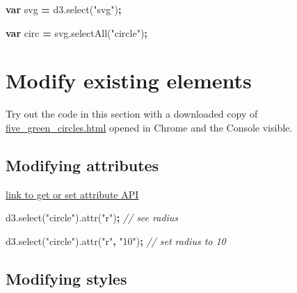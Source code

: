\documentclass[openany]{book}
\newenvironment{Shaded}{\begin{snugshade}}{\end{snugshade}}
\newcommand{\AttributeTok}[1]{\textcolor[rgb]{0.77,0.63,0.00}{#1}}
\newcommand{\CommentTok}[1]{\textcolor[rgb]{0.56,0.35,0.01}{\textit{#1}}}
\newcommand{\KeywordTok}[1]{\textcolor[rgb]{0.13,0.29,0.53}{\textbf{#1}}}
\newcommand{\NormalTok}[1]{#1}
\newcommand{\OperatorTok}[1]{\textcolor[rgb]{0.81,0.36,0.00}{\textbf{#1}}}
\newcommand{\StringTok}[1]{\textcolor[rgb]{0.31,0.60,0.02}{#1}}
\newcommand{\VariableTok}[1]{\textcolor[rgb]{0.00,0.00,0.00}{#1}}
\begin{document}
\begin{Shaded}
\begin{Highlighting}[]
\KeywordTok{var}\NormalTok{ svg }\OperatorTok{=} \VariableTok{d3}\NormalTok{.}\AttributeTok{select}\NormalTok{(}\StringTok{"svg"}\NormalTok{)}\OperatorTok{;}

\KeywordTok{var}\NormalTok{ circ }\OperatorTok{=} \VariableTok{svg}\NormalTok{.}\AttributeTok{selectAll}\NormalTok{(}\StringTok{"circle"}\NormalTok{)}\OperatorTok{;}
\end{Highlighting}
\end{Shaded}

\hypertarget{modify-existing-elements}{%
\section{Modify existing elements }\label{modify-existing-elements}}

Try out the code in this section with a downloaded copy of \href{https://raw.githubusercontent.com/jtr13/d3book/master/code/five_green_circles.html}{five\_green\_circles.html} opened in Chrome and the Console visible.

\hypertarget{modifying-attributes}{%
\subsection{Modifying attributes}\label{modifying-attributes}}

\href{https://github.com/d3/d3-selection/blob/v1.4.0/README.md\#selection_attr}{link to get or set attribute API}

\begin{Shaded}
\begin{Highlighting}[]
\VariableTok{d3}\NormalTok{.}\AttributeTok{select}\NormalTok{(}\StringTok{"circle"}\NormalTok{).}\AttributeTok{attr}\NormalTok{(}\StringTok{"r"}\NormalTok{)}\OperatorTok{;}           \CommentTok{// see radius}

\VariableTok{d3}\NormalTok{.}\AttributeTok{select}\NormalTok{(}\StringTok{"circle"}\NormalTok{).}\AttributeTok{attr}\NormalTok{(}\StringTok{"r"}\OperatorTok{,} \StringTok{"10"}\NormalTok{)}\OperatorTok{;}     \CommentTok{// set radius to 10}
\end{Highlighting}
\end{Shaded}

\hypertarget{modifying-styles}{%
\subsection{Modifying styles}\label{modifying-styles}}
\end{document}
